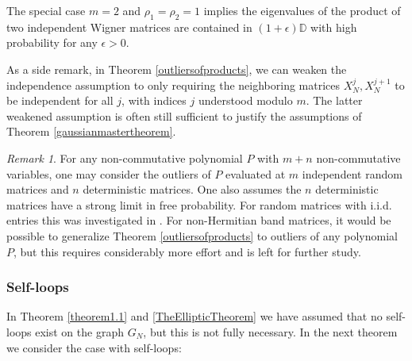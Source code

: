 \documentclass[11pt,reqno]{amsart}
\theoremstyle{plain}
\theoremstyle{remark}
\newtheorem{remark}[theorem]{Remark}
\numberwithin{equation}{section}
\begin{document}
The special case $m=2$ and $\rho_1=\rho_2=1$ implies the eigenvalues of the product of two independent Wigner matrices are contained in $(1+\epsilon)\mathbb{D}$ with high probability for any $\epsilon>0$.

As a side remark, in Theorem \ref{outliersofproducts}, we can weaken the independence assumption to only requiring the neighboring matrices $X_N^j,X_N^{j+1}$ to be independent for all $j$, with indices $j$ understood modulo $m$. The latter weakened assumption is often still sufficient to justify the assumptions of Theorem \ref{gaussianmastertheorem}.


\begin{remark}
    For any non-commutative polynomial $P$ with $m+n$ non-commutative variables, one may consider the outliers of $P$ evaluated at $m$ independent random matrices and $n$ deterministic matrices. One also assumes the $n$ deterministic matrices have a strong limit in free probability. For random matrices with i.i.d. entries this was investigated in \cite{belinschi2021outlier}. For non-Hermitian band matrices, it would be possible to generalize Theorem \ref{outliersofproducts} to outliers of any polynomial $P$, but this requires considerably more effort and is left for further study.
\end{remark}

\subsubsection{Self-loops}
In Theorem \ref{theorem1.1} and \ref{TheEllipticTheorem} we have assumed that no self-loops exist on the graph $G_N$, but this is not fully necessary. In the next theorem we consider the case with self-loops:
\end{document}
